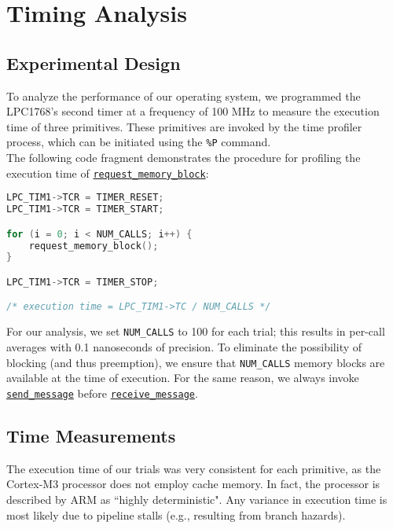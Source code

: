 \documentclass[12pt]{report}
\begin{document}
\chapter{Timing Analysis}

\section{Experimental Design}
\label{sec:timing}

To analyze the performance of our operating system, we programmed the LPC1768's second timer at a frequency of 100 MHz to measure the execution time of three primitives. These primitives are invoked by the time profiler process, which can be initiated using the \texttt{\%P} command.\\

The following code fragment demonstrates the procedure for profiling the execution time of \hyperref[alg:requestingmemoryblocks]{\texttt{request_memory_block}}:

\begin{minipage}{\textwidth}
\begin{lstlisting}[language=C, frame=single]
LPC_TIM1->TCR = TIMER_RESET;
LPC_TIM1->TCR = TIMER_START;

for (i = 0; i < NUM_CALLS; i++) {
    request_memory_block();
}

LPC_TIM1->TCR = TIMER_STOP;

/* execution time = LPC_TIM1->TC / NUM_CALLS */

\end{lstlisting}
\end{minipage}

For our analysis, we set \texttt{NUM_CALLS} to 100 for each trial; this results in per-call averages with 0.1 nanoseconds of precision. To eliminate the possibility of blocking (and thus preemption), we ensure that \texttt{NUM_CALLS} memory blocks are available at the time of execution. For the same reason, we always invoke \hyperref[alg:sendingmessages]{\texttt{send_message}} before \hyperref[alg:receivingmessages]{\texttt{receive_message}}.

\section{Time Measurements}

The execution time of our trials was very consistent for each primitive, as the Cortex-M3 processor does not employ cache memory. In fact, the processor is described by ARM as ``highly deterministic". Any variance in execution time is most likely due to pipeline stalls (e.g., resulting from branch hazards).
\end{document}
